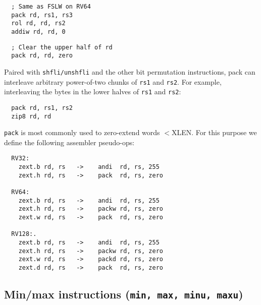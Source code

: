 \begin{minipage}{\linewidth}
\begin{verbatim}
  ; Same as FSLW on RV64
  pack rd, rs1, rs3
  rol rd, rd, rs2
  addiw rd, rd, 0
\end{verbatim}
\end{minipage}

\begin{minipage}{\linewidth}
\begin{verbatim}
  ; Clear the upper half of rd
  pack rd, rd, zero
\end{verbatim}
\end{minipage}

Paired with {\tt shfli/unshfli} and the other bit permutation instructions,
pack can interleave arbitrary power-of-two chunks of {\tt rs1} and {\tt rs2}. For
example, interleaving the bytes in the lower halves of {\tt rs1} and {\tt rs2}:

\begin{minipage}{\linewidth}
\begin{verbatim}
  pack rd, rs1, rs2
  zip8 rd, rd
\end{verbatim}
\end{minipage}

{\tt pack} is most commonly used to zero-extend words $<$XLEN.
For this purpose we define the following assembler pseudo-ops:

\begin{minipage}{\linewidth}
\begin{verbatim}
  RV32:
    zext.b rd, rs   ->    andi  rd, rs, 255
    zext.h rd, rs   ->    pack  rd, rs, zero

  RV64:
    zext.b rd, rs   ->    andi  rd, rs, 255
    zext.h rd, rs   ->    packw rd, rs, zero
    zext.w rd, rs   ->    pack  rd, rs, zero

  RV128:.
    zext.b rd, rs   ->    andi  rd, rs, 255
    zext.h rd, rs   ->    packw rd, rs, zero
    zext.w rd, rs   ->    packd rd, rs, zero
    zext.d rd, rs   ->    pack  rd, rs, zero
\end{verbatim}
\end{minipage}


\subsection{Min/max instructions (\texttt{min, max, minu, maxu})}

